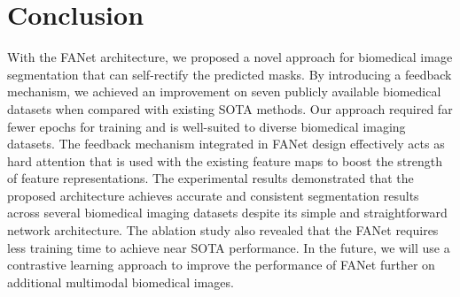 \documentclass[journal]{IEEEtran}
\begin{document}
\section{Conclusion}
\label{conclusion}
With the FANet architecture, we proposed a novel approach for biomedical image segmentation that can self-rectify the predicted masks. By introducing a feedback mechanism, we achieved an improvement on seven publicly available biomedical datasets when compared with existing \ac{SOTA} methods. Our approach required far fewer epochs for training and is well-suited to diverse biomedical imaging datasets. The feedback mechanism integrated in FANet design effectively acts as hard attention that is used with the existing feature maps to boost the strength of feature representations. The experimental results demonstrated that the proposed architecture achieves accurate and consistent segmentation results across several biomedical imaging datasets despite its simple and straightforward network architecture. The ablation study also revealed that the FANet requires less training time to achieve near \ac{SOTA} performance. In the future, we will use a contrastive learning approach to improve the performance of FANet further on additional multimodal biomedical images. 





 
\end{document}
